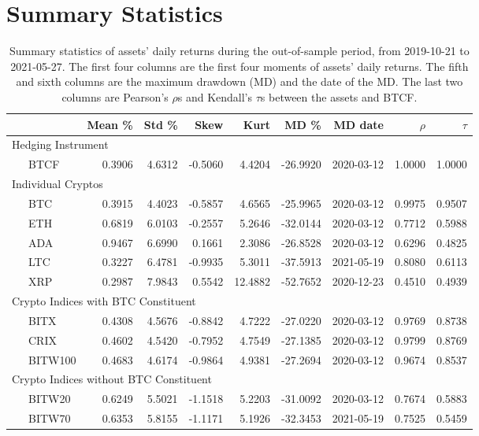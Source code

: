 \documentclass[11pt,a4paper,english]{article}
\begin{document}
\section{Summary Statistics}\label{appendix:summary_stats}

{\small %
  \begin{table}[th] \centering %
    {%
\begin{tabular}{lrrrrrrrr} \toprule
         {} &    Mean \% &     Std \% &      Skew &       Kurt &         MD \% &     MD date & $\rho$ & $\tau$ \\
\midrule
     \multicolumn{9}{l}{Hedging Instrument} \\
\ \ \ BTCF    &  0.3906 &  4.6312 & -0.5060 &   4.4204 & -26.9920 &  2020-03-12 &  1.0000 &  1.0000 \\
     \multicolumn{9}{l}{Individual Cryptos}                                                                                 \\
\ \ \ BTC     &  0.3915 &  4.4023 & -0.5857 &   4.6565 & -25.9965 &  2020-03-12 &  0.9975 &  0.9507 \\
\ \ \ ETH     &  0.6819 &  6.0103 & -0.2557 &   5.2646 & -32.0144 &  2020-03-12 &  0.7712 &  0.5988 \\
\ \ \ ADA     &  0.9467 &  6.6990 &  0.1661 &   2.3086 & -26.8528 &  2020-03-12 &  0.6296 &  0.4825 \\
\ \ \ LTC     &  0.3227 &  6.4781 & -0.9935 &   5.3011 & -37.5913 &  2021-05-19 &  0.8080 &  0.6113 \\
\ \ \ XRP     &  0.2987 &  7.9843 &  0.5542 &  12.4882 & -52.7652 &  2020-12-23 &  0.4510 &  0.4939 \\
   \multicolumn{9}{l}{Crypto Indices with BTC Constituent}                                                                  \\
\ \ \ BITX    &  0.4308 &  4.5676 & -0.8842 &   4.7222 & -27.0220 &  2020-03-12 &  0.9769 &  0.8738 \\
\ \ \ CRIX    &  0.4602 &  4.5420 & -0.7952 &   4.7549 & -27.1385 &  2020-03-12 &  0.9799 &  0.8769 \\
\ \ \ BITW100 &  0.4683 &  4.6174 & -0.9864 &   4.9381 & -27.2694 &  2020-03-12 &  0.9674 &  0.8537 \\
    \multicolumn{9}{l}{Crypto Indices without BTC Constituent}                                                              \\
\ \ \ BITW20  &  0.6249 &  5.5021 & -1.1518 &   5.2203 & -31.0092 &  2020-03-12 &  0.7674 &  0.5883 \\
\ \ \ BITW70  &  0.6353 &  5.8155 & -1.1171 &   5.1926 & -32.3453 &  2021-05-19 &  0.7525 &  0.5459 \\
\bottomrule
\end{tabular}}
\caption{Summary statistics of assets' daily returns during the out-of-sample period, from 2019-10-21 to 2021-05-27.
        The first four columns are the first four moments of assets' daily returns.
        The fifth and sixth columns are the maximum drawdown (MD) and the date of the MD.
        The last two columns are Pearson's $\rho$s and Kendall's $\tau$s between the assets and BTCF. }
\label{tab:SSA}

\end{table}
}
\end{document}
